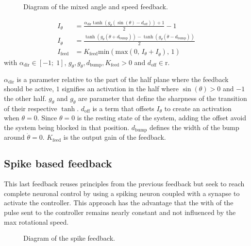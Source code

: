 \begin{figure}[!htb]
    \centering
    \caption{Diagram of the mixed angle and speed feedback.}
    \label{fig:speed_angle}
\end{figure}

\begin{align}
    I_\theta &= \frac{\alpha_\text{dir}\tanh\left(g_\theta\left(\sin\left(\theta\right)-d_\text{off}\right)\right) + 1}{2} - 1\label{eq:speed_theta}\\
    I_{\dot{\theta}} &= \frac{\tanh\left(g_{\dot{\theta}}\left(\dot{\theta}+d_\text{bump}\right)\right) -\tanh\left(g_{\dot{\theta}}\left(\dot{\theta}-d_\text{bump}\right)\right)}{2}\label{eq:speed_bump}\\
    I_\text{feed} &= K_\text{feed}\text{min}\left(\text{max}\left(0,\, I_\theta + I_{\dot{\theta}}\right),\, 1\right)
\end{align}
with $\alpha_\text{dir} \in \left[-1;\;1\right]$, $g_\theta, g_{\dot{\theta}}, d_\text{bump}, K_\text{feed} > 0$ and $d_\text{off} \in \mathrm{r}$.

$\alpha_\text{dir}$ is a parameter relative to the part of the half plane where the feedback should be active, $1$ signifies an activation in the half where $\sin\left(\theta\right)>0$ and $-1$ the other half. 
$g_\theta$ and $g_{\dot{\theta}}$ are parameter that define the sharpness of the transition of their respective $\tanh$.
$d_\text{off}$ is a term that offsets $I_\theta$ to create an activation when $\theta = 0$. Since $\theta = 0$ is the resting state of the system, adding the offset avoid the system being blocked in that position.
$d_\text{bump}$ defines the width of the bump around $\dot{\theta} = 0$. 
$K_\text{feed}$ is the output gain of the feedback.

\subsection{Spike based feedback}

This last feedback reuses principles from the previous feedback but seek to reach complete neuronal control by using a spiking neuron coupled with a synapse to activate the controller. This approach has the advantage that the with of the pulse sent to the controller remains nearly constant and not influenced by the max rotational speed.

\begin{figure}[!htb]
    \centering
    \caption{Diagram of the spike feedback.}
    \label{fig:spike_feed}
\end{figure}

